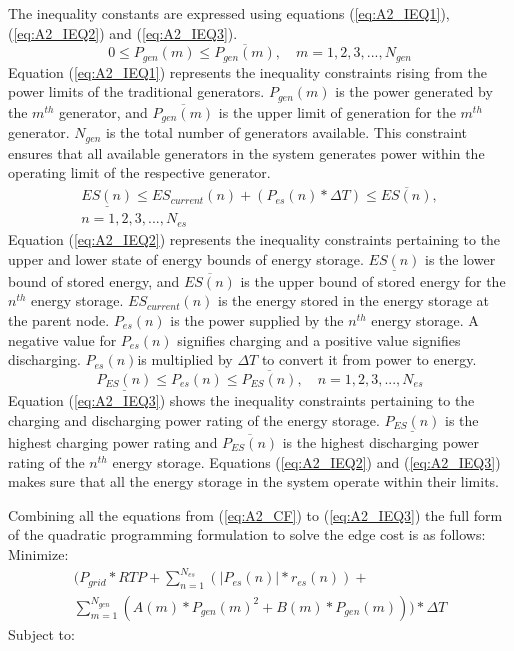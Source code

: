 The inequality constants are expressed using equations (\ref{eq:A2_IEQ1}), (\ref{eq:A2_IEQ2}) and (\ref{eq:A2_IEQ3}).
\begin{equation}
\label{eq:A2_IEQ1}
0 \leq P_{gen}(m) \leq \overline{P_{gen}(m)}, \quad m = 1, 2, 3, ... , N_{gen}
\end{equation}
Equation (\ref{eq:A2_IEQ1}) represents the inequality constraints rising from the power limits of the traditional generators. $P_{gen}(m)$ is the power generated by the $m^{th}$ generator, and $\overline{P_{gen}(m)}$ is the upper limit of generation for the $m^{th}$ generator. $N_{gen}$ is the total number of generators available. This constraint ensures that all available generators in the system generates power within the operating limit of the respective generator.
\begin{multline}
\label{eq:A2_IEQ2}
\underline{ES(n)} \leq ES_{current}(n)+(P_{es}(n)*\Delta T) \leq \overline{ES(n)}, \\ n = 1, 2, 3, ... , N_{es}
\end{multline}
Equation (\ref{eq:A2_IEQ2}) represents the inequality constraints pertaining to the upper and lower state of energy bounds of energy storage. $\underline{ES(n)}$ is the lower bound of stored energy, and $\overline{ES(n)}$ is the upper bound of stored energy for the $n^{th}$ energy storage. $ES_{current}(n)$ is the energy stored in the energy storage at the parent node. $P_{es}(n)$ is the power supplied by the $n^{th}$ energy storage. A negative value for $P_{es}(n)$ signifies charging and a positive value signifies discharging. $P_{es}(n)$is multiplied by $\Delta T$ to convert it from power to energy.
\begin{equation}
\label{eq:A2_IEQ3}
\underline{P_{ES}(n)} \leq P_{es}(n) \leq \overline{P_{ES}(n)}, \quad n = 1, 2, 3, ... , N_{es}
\end{equation}
Equation (\ref{eq:A2_IEQ3}) shows the inequality constraints pertaining to the charging and discharging power rating of the energy storage. $\underline{P_{ES}(n)}$ is the highest charging power rating  and $\overline{P_{ES}(n)}$ is the highest discharging power rating of the $n^{th}$ energy storage. Equations (\ref{eq:A2_IEQ2}) and (\ref{eq:A2_IEQ3}) makes sure that all the energy storage in the system operate within their limits.

Combining all the equations from (\ref{eq:A2_CF}) to (\ref{eq:A2_IEQ3}) the full form of the quadratic programming formulation to solve the edge cost is as follows:\\
Minimize:
\begin{multline}
\label{eq:multi_all_in1}
(P_{grid} * RTP + \sum_{n=1}^{N_{es}} (|P_{es}(n)|*r_{es}(n)) + \\ \sum_{m=1}^{N_{gen}}(A(m)*P_{gen}(m)^2 + B(m)*P_{gen}(m)))*\Delta T
\end{multline}
Subject to:\\

